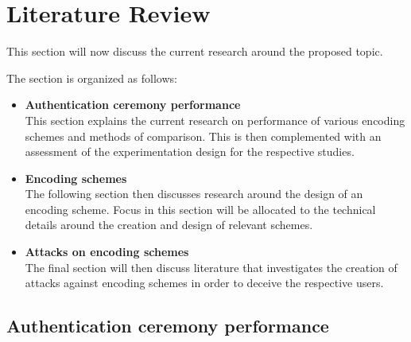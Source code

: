 \section{Literature Review}
This section will now discuss the current research around the proposed topic.

The section is organized as follows:

\begin{itemize}
    \item \textbf{Authentication ceremony performance} \\
    This section explains the current research on performance of various encoding schemes and methods of comparison. This is then complemented with an assessment of the experimentation design for the respective studies.

    \item \textbf{Encoding schemes} \\
    The following section then discusses research around the design of an encoding scheme. Focus in this section will be allocated to the technical details around the creation and design of relevant schemes. 

    \item \textbf{Attacks on encoding schemes} \\
    The final section will then discuss literature that investigates the creation of attacks against encoding schemes in order to deceive the respective users.
\end{itemize}

\subsection{Authentication ceremony performance}

